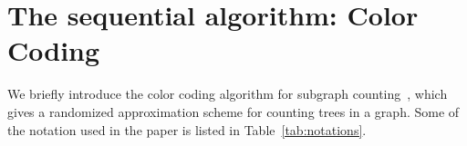 
\section{The sequential algorithm: Color Coding}
\label{sec:sequential}


\begin{table}[hptb]
\caption{Notations}
\label{tab:notations}
\end{table}




We briefly introduce the color coding algorithm for subgraph
counting~\cite{alon1995color}, which gives a randomized approximation scheme for
counting trees in a graph.  Some of the notation used in the paper is listed in
Table~\ref{tab:notations}.

